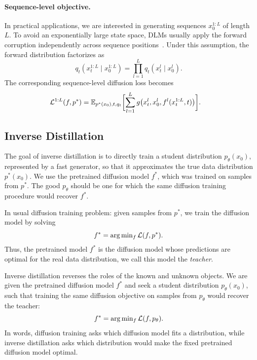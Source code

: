     \paragraph{Sequence-level objective.}
    In practical applications, we are interested in generating sequences $x_0^{1:L}$ of length $L$. To avoid an exponentially large state space, DLMs usually apply the forward corruption independently across sequence positions~\citep{lou2024discrete}. Under this assumption, the forward distribution factorizes as
    \[
        q_t(x_t^{1:L} \mid x_0^{1:L})
        = \prod_{l=1}^L q_t(x_t^l \mid x_0^l).
    \]
    The corresponding sequence-level diffusion loss becomes
    \begin{equation}
    \label{eq:sequence level loss}
    \begin{aligned}
    \mathcal{L}^{1:L}(f,p^*)
    &=
    \mathbb{E}_{p^*(x_0), t, q_t}\biggl[
        \sum_{l=1}^L
        g\bigl(
        x_t^l,x_0^l,f^l(x_t^{1:L},t)
        \bigr) \nonumber
    \biggr].
    \end{aligned}
    \end{equation}


\subsection{Inverse Distillation}
\label{sec:inverse distillation}

    The goal of inverse distillation is to directly train a student distribution $p_\theta(x_0)$, represented by a fast generator, so that it approximates the true data distribution $p^*(x_0)$. We use the pretrained diffusion model $f^*$, which was trained on samples from $p^*$. The good $p_\theta$ should be one for which the same diffusion training procedure would recover $f^*$.

    In usual diffusion training problem: given samples from $p^*$, we train the diffusion model by solving
    \begin{equation}
        f^* = \arg\min\nolimits_{f} \mathcal{L}(f, p^*).
        \label{eq:teacher_objective_discr}
    \end{equation}
    Thus, the pretrained model $f^*$ is the diffusion model whose predictions are optimal for the real data distribution, we call this model the \textit{teacher}.

    Inverse distillation reverses the roles of the known and unknown objects. We are given the pretrained diffusion model $f^*$ and seek a student distribution $p_\theta(x_0)$, such that training the same diffusion objective on samples from $p_\theta$ would recover the teacher:
    \begin{equation}
        f^* = \arg\min\nolimits_{f} \mathcal{L}(f, p_{\theta}).
        \label{eq:inverse_optimality_condition}
    \end{equation}
    In words, diffusion training asks which diffusion model fits a distribution, while inverse distillation asks which distribution would make the fixed pretrained diffusion model optimal.

